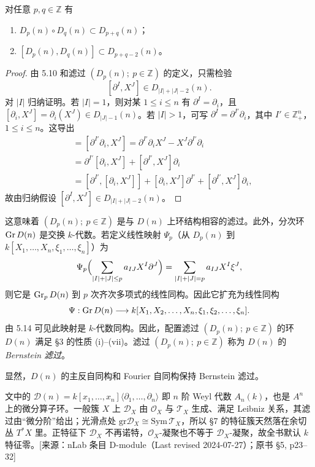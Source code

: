 \begin{lemma}
对任意 $p,q\in\mathbb{Z}$ 有
\begin{enumerate}[label=(\roman*)]
  \item $D_p(n)\circ D_q(n)\subset D_{p+q}(n)$；
  \item $[D_p(n),D_q(n)]\subset D_{p+q-2}(n)$。
\end{enumerate}
\end{lemma}

\begin{proof}
由 5.10 和滤过 $(D_p(n);\ p\in\mathbb{Z})$ 的定义，只需检验
$$[\partial^I,X^J]\in D_{|I|+|J|-2}(n).$$
对 $|I|$ 归纳证明。若 $|I|=1$，则对某 $1\le i\le n$ 有 $\partial^I=\partial_i$，且 $[\partial_i,X^J]=\partial_i(X^J)\in D_{|J|-1}(n)$。若 $|I|>1$，可写 $\partial^I=\partial^{I'}\partial_i$，其中 $I'\in\mathbb{Z}_+^n$，$1\le i\le n$。这导出
\begin{align*}
[\partial^I,X^J]&=[\partial^{I'}\partial_i,X^J]=\partial^{I'}\partial_i X^J-X^J\partial^{I'}\partial_i\\
&=\partial^{I'}[\partial_i,X^J]+[\partial^{I'},X^J]\partial_i\\
&=[\partial^{I'},[\partial_i,X^J]]+[\partial_i,X^J]\partial^{I'}+[\partial^{I'},X^J]\partial_i,
\end{align*}
故由归纳假设 $[\partial^I,X^J]\in D_{|I|+|J|-2}(n)$。
\end{proof}

这意味着 $(D_p(n);\ p\in\mathbb{Z})$ 是与 $D(n)$ 上环结构相容的滤过。此外，分次环 $\operatorname{Gr} D(n)$ 是交换 $k$-代数。若定义线性映射 $\Psi_p$（从 $D_p(n)$ 到 $k[X_1,\dots,X_n,\xi_1,\dots,\xi_n]$）为
$$\Psi_p\Bigl(\sum_{|I|+|J|\le p}a_{IJ}X^I\partial^J\Bigr)=\sum_{|I|+|J|=p}a_{IJ}X^I\xi^J,$$
则它是 $\operatorname{Gr}_p D(n)$ 到 $p$ 次齐次多项式的线性同构。因此它扩充为线性同构
$$\Psi:\operatorname{Gr} D(n)\longrightarrow k[X_1,X_2,\dots,X_n,\xi_1,\xi_2,\dots,\xi_n].$$
由 5.14 可见此映射是 $k$-代数同构。因此，配置滤过 $(D_p(n);\ p\in\mathbb{Z})$ 的环 $D(n)$ 满足 §3 的性质 (i)--(vii)。滤过 $(D_p(n);\ p\in\mathbb{Z})$ 称为 $D(n)$ 的\emph{Bernstein 滤过}。

显然，$D(n)$ 的主反自同构和 Fourier 自同构保持 Bernstein 滤过。
\begin{annote}
文中的 $\mathcal D(n)=k[x_1,\dots,x_n]\langle\partial_1,\dots,\partial_n\rangle$ 即 $n$ 阶 Weyl 代数 $A_n(k)$，也是 $A^n$ 上的微分算子环。一般簇 $X$ 上 $\mathcal D_X$ 由 $\mathcal O_X$ 与 $\mathcal T_X$ 生成、满足 Leibniz 关系，其滤过由“微分阶”给出；光滑点处 $\mathrm{gr}\mathcal D_X\cong\mathrm{Sym}\,\mathcal T_X$，所以 §7 的特征簇天然落在余切丛 $T^*X$ 里。正特征下 $\mathcal D_X$ 不再诺特，$\mathcal O_X$-凝聚也不等于 $\mathcal D_X$-凝聚，故全书默认 $k$ 特征零。[来源：nLab 条目 D-module（Last revised 2024-07-27）；原书 §5, p23–32]
\end{annote}



